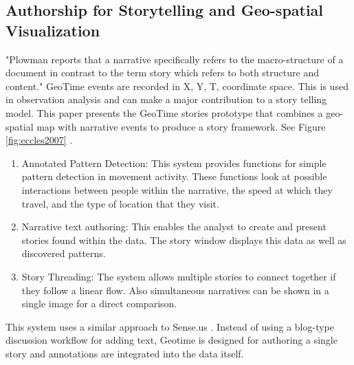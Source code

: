 \documentclass{egpubl}
\begin{document}
\subsection{Authorship for Storytelling and Geo-spatial Visualization}
%
"Plowman \cite{plowman1999} reports that a narrative specifically refers to the macro-structure of a document in contrast to the term story which refers to both structure and content."
GeoTime events are recorded in X, Y, T, coordinate space. This is used in observation analysis and can make a major contribution to a story telling model. This paper presents the GeoTime stories prototype that combines a geo-spatial map with narrative events to produce a story framework. See Figure \ref{fig:eccles2007} \cite{eccles2007}.
\begin{enumerate}
\item Annotated Pattern Detection: This system provides functions for simple pattern detection in movement activity. These functions look at possible interactions between people within the narrative, the speed at which they travel, and the type of location that they visit.
\item Narrative text authoring: This enables the analyst to create and present stories found within the data. The story window displays this data as well as discovered patterns. 
\item Story Threading: The system allows multiple stories to connect together if they follow a linear flow. Also simultaneous narratives can be shown in a single image for a direct comparison.
\end{enumerate}
 This system uses a similar approach to Sense.us \cite{heer2007}. Instead of using a blog-type discussion workflow for adding text, Geotime is designed for authoring a single story and annotations are integrated into the data itself.
\end{document}
